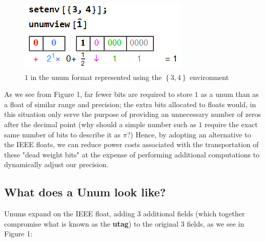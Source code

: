 \documentclass[twocolumn]{IEEEtran}
\begin{document}
\begin{figure}[h]

\begin{center}

\includegraphics[scale=0.7]{unumview1}
\caption{$1$ in the unum format represented using the $\left\{3,4\right\}$ environment}

\end{center}

\end{figure}

As we see from Figure 1, far fewer bits are required to store $1$ as a unum than as a float of similar range and precision; the extra bits  allocated to floats would, in this situation only serve the purpose of providing an unnecessary number of zeros after the decimal point (why should a simple number such as $1$ require the exact same number of bits to describe it as $\pi$?) Hence, by adopting an alternative to the IEEE floats, we can reduce power costs associated with the transportation of these "dead weight bits" at the expense of performing additional computations to dynamically adjust our precision.

\subsection{What does a Unum look like?}
Unums expand on the IEEE float, adding 3 additional fields (which together compromise what is known as the \textbf{utag}) to the original 3 fields, as  we see in Figure 1:
\end{document}
